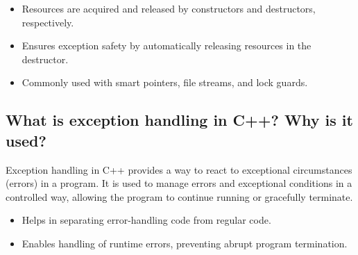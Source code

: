 \begin{itemize}
    \item Resources are acquired and released by constructors and destructors, respectively.
    \item Ensures exception safety by automatically releasing resources in the destructor.
    \item Commonly used with smart pointers, file streams, and lock guards.
\end{itemize}

\subsection{What is exception handling in C++? Why is it used?}
Exception handling in C++ provides a way to react to exceptional circumstances (errors) in a program. It is used to manage errors and exceptional conditions in a controlled way, allowing the program to continue running or gracefully terminate.

\begin{itemize}
    \item Helps in separating error-handling code from regular code.
    \item Enables handling of runtime errors, preventing abrupt program termination.
\end{itemize}

